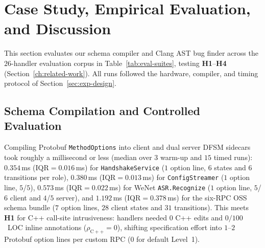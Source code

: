 \section{Case Study, Empirical Evaluation, and Discussion}
\label{ch:case-study}

This section evaluates our schema compiler and Clang AST bug finder across the $26$-handler evaluation corpus in Table~\ref{tab:eval-suites}, testing \textbf{H1}--\textbf{H4} (Section~\ref{ch:related-work}). All runs followed the hardware, compiler, and timing protocol of Section~\ref{sec:exp-design}.

\subsection{Schema Compilation and Controlled Evaluation}
\label{sec:controlled-eval}

Compiling Protobuf \texttt{MethodOptions} into client and dual server DFSM sidecars took roughly a millisecond or less (median over $3$ warm-up and $15$ timed runs): $0.354$\,ms ($\mathrm{IQR}=0.016$\,ms) for \texttt{HandshakeService} ($1$ option line, $6$ states and $6$ transitions per role), $0.380$\,ms ($\mathrm{IQR}=0.013$\,ms) for \texttt{ConfigStreamer} ($1$ option line, $5$/$5$), $0.573$\,ms ($\mathrm{IQR}=0.022$\,ms) for WeNet \texttt{ASR.\allowbreak Recognize} ($1$ option line, $5$/$6$ client and $4$/$5$ server), and $1.192$\,ms ($\mathrm{IQR}=0.378$\,ms) for the six-RPC OSS schema bundle ($7$ option lines, $28$ client states and $31$ transitions). This meets \textbf{H1} for C++ call-site intrusiveness: handlers needed $0$ C++ edits and $0/100$~LOC inline annotations ($\rho_{\mathrm{C++}}=0$), shifting specification effort into $1$--$2$ Protobuf option lines per custom RPC ($0$ for default Level~1).


